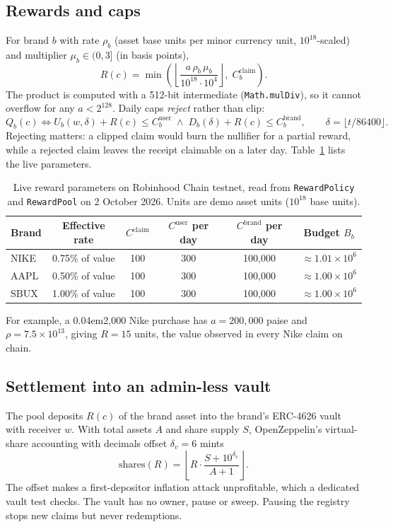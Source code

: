 \documentclass[10.5pt,letterpaper]{article}
\newcommand{\inr}{{\scalebox{0.82}{\faRupeeSign}}\kern0.04em}
\theoremstyle{definition}
\theoremstyle{remark}
\newcommand{\ttt}[1]{\texttt{#1}}
\begin{document}
\subsection{Rewards and caps}
For brand $b$ with rate $\rho_b$ (asset base units per minor currency unit, $10^{18}$-scaled) and multiplier
$\mu_b\in(0,3]$ (in basis points),
\begin{equation}\label{eq:reward}
R(c) = \min\!\left( \left\lfloor \frac{a\,\rho_b\,\mu_b}{10^{18}\cdot 10^{4}} \right\rfloor,\; C_b^{\mathrm{claim}} \right).
\end{equation}
The product is computed with a 512-bit intermediate (\ttt{Math.mulDiv}), so it cannot overflow for any
$a<2^{128}$. Daily caps \emph{reject} rather than clip:
\begin{equation}\label{eq:caps}
Q_b(c) \iff U_b(w,\delta)+R(c)\le C_b^{\mathrm{user}} \;\wedge\; D_b(\delta)+R(c)\le C_b^{\mathrm{brand}},\qquad \delta=\lfloor t/86400\rfloor .
\end{equation}
Rejecting matters: a clipped claim would burn the nullifier for a partial reward, while a rejected claim leaves the
receipt claimable on a later day. Table~\ref{tab:params} lists the live parameters.

\begin{table}[!htb]
\centering\small
\caption{Live reward parameters on Robinhood Chain testnet, read from \ttt{RewardPolicy} and \ttt{RewardPool} on 2 October 2026. Units are demo asset units ($10^{18}$ base units).}
\label{tab:params}
\begin{tabular}{@{}lccccc@{}}
\toprule
Brand & Effective rate & $C^{\mathrm{claim}}$ & $C^{\mathrm{user}}$ per day & $C^{\mathrm{brand}}$ per day & Budget $B_b$\\
\midrule
NIKE & 0.75\% of value & 100 & 300 & 100{,}000 & $\approx 1.01\times10^6$\\
AAPL & 0.50\% of value & 100 & 300 & 100{,}000 & $\approx 1.00\times10^6$\\
SBUX & 1.00\% of value & 100 & 300 & 100{,}000 & $\approx 1.00\times10^6$\\
\bottomrule
\end{tabular}
\end{table}

For example, a \inr 2{,}000 Nike purchase has $a=200{,}000$ paise and $\rho=7.5\times10^{13}$, giving $R=15$ units, the value
observed in every Nike claim on chain.

\subsection{Settlement into an admin-less vault}
The pool deposits $R(c)$ of the brand asset into the brand's ERC-4626 vault~\cite{erc4626} with receiver $w$. With total
assets $A$ and share supply $S$, OpenZeppelin's virtual-share accounting with decimals offset $\delta_v=6$ mints
\begin{equation}
\mathrm{shares}(R) = \left\lfloor R\cdot\frac{S+10^{\delta_v}}{A+1}\right\rfloor .
\end{equation}
The offset makes a first-depositor inflation attack unprofitable, which a dedicated vault test checks.
The vault has no owner, pause or sweep. Pausing the registry stops new claims but never redemptions.
\end{document}
